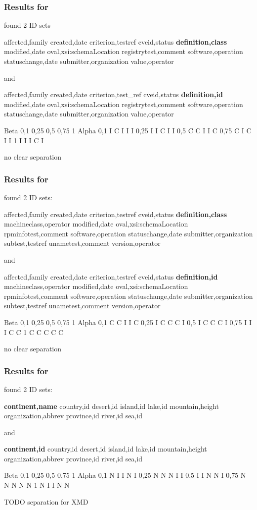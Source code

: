 \subsubsection{Results for }

found 2 ID sets

affected,family
created,date
criterion,testref
cveid,status
\textbf{definition,class}
modified,date
oval,xsi:schemaLocation
registrytest,comment
software,operation
statuschange,date
submitter,organization
value,operator

and

affected,family
created,date
criterion,test\_ref
cveid,status
\textbf{definition,id}
modified,date
oval,xsi:schemaLocation
registrytest,comment
software,operation
statuschange,date
submitter,organization
value,operator

		Beta
     		  0,1	0,25	0,5	0,75	1
Alpha	0,1	I	C	I	I	I
	    0,25	I	I	C	I	I
	    0,5	C	C	I	I	C
	    0,75	C	I	C	I	I
	    1	I	I	I	C	I

no clear separation

\subsubsection{Results for }

found 2 ID sets:

affected,family
created,date
criterion,testref
cveid,status
\textbf{definition,class}
machineclass,operator
modified,date
oval,xsi:schemaLocation
rpminfotest,comment
software,operation
statuschange,date
submitter,organization
subtest,testref
unametest,comment
version,operator

and

affected,family
created,date
criterion,testref
cveid,status
\textbf{definition,id}
machineclass,operator
modified,date
oval,xsi:schemaLocation
rpminfotest,comment
software,operation
statuschange,date
submitter,organization
subtest,testref
unametest,comment
version,operator

          Beta
		      0,1	0,25	0,5	0,75	1
Alpha	0,1	C	C	I	I	C
	    0,25	I	C	C	C	I
	    0,5	I	C	C	C	I
	    0,75	I	I	I	C	C
	    1	C	C	C	C	C

no clear separation

\subsubsection{Results for }

found 2 ID sets:

\textbf{continent,name}
country,id
desert,id
island,id
lake,id
mountain,height
organization,abbrev
province,id
river,id
sea,id

and

\textbf{continent,id}
country,id
desert,id
island,id
lake,id
mountain,height
organization,abbrev
province,id
river,id
sea,id

		              Beta
      		0,1	0,25	0,5	0,75	1
Alpha	0,1	N	I	I	N	I
	    0,25	N	N	N	I	I
	    0,5	I	I	N	N	I
	    0,75	N	N	N	N	N
	    1	N	I	I	N	N

TODO separation for XMD
